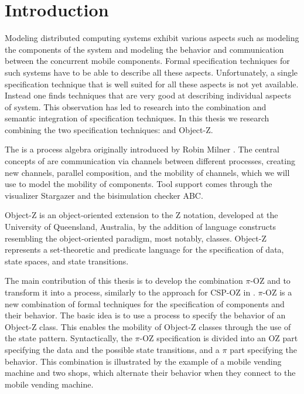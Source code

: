 \chapter{Introduction}
\pagestyle{scrheadings}	
\setcounter{page}{0}
\label{chp_introduction}
Modeling distributed computing systems exhibit various aspects such as modeling the components of the system and modeling the behavior and communication between the concurrent mobile components. Formal specification techniques for such systems have to be able to describe all these aspects. Unfortunately, a single specification technique that is well suited for all these aspects is not yet available. Instead one finds techniques that are very good at describing individual aspects of system. This observation has led to research into the combination and semantic integration of specification techniques. In this thesis we research combining the two specification techniques:
\picalc{} and Object-Z.

The \picalc{} is a process algebra originally introduced by Robin Milner \cite{milner}. The central concepts of \picalc{} are communication via channels between different processes, creating new channels, parallel composition, and the mobility of channels, which we will use to model the mobility of components. Tool support comes through the \picalc{} visualizer Stargazer and the bisimulation checker ABC.

Object-Z is an object-oriented extension to the Z notation, developed at the University of Queensland, Australia, by the addition of language constructs resembling the object-oriented paradigm, most notably, classes. Object-Z represents a set-theoretic and predicate language for the specification of data, state spaces, and state transitions.

The main contribution of this thesis is to develop the combination $\pi$-OZ and to transform it into a \picalc{} process, similarly to the approach for CSP-OZ in \cite{olderog}. $\pi$-OZ is a new combination of formal techniques for the specification of components and their behavior. The basic idea is to use a \picalc{} process to specify the behavior of an Object-Z class. This enables the mobility of Object-Z classes through the use of the state pattern. Syntactically, the $\pi$-OZ specification is divided into an OZ part specifying the data and the possible state transitions, and a $\pi$ part specifying the behavior.  This combination is illustrated by the example of a mobile vending machine and two shops, which alternate their behavior when they connect to the mobile vending machine.

